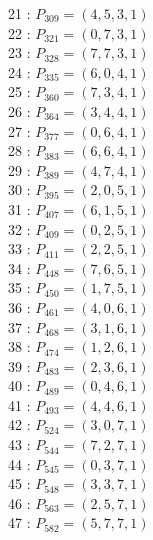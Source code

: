 \documentclass{article}
\begin{document}
{\begin{multicols}{2}
21 : $P_{309}=( 4, 5, 3, 1 )$\\
22 : $P_{321}=( 0, 7, 3, 1 )$\\
23 : $P_{328}=( 7, 7, 3, 1 )$\\
24 : $P_{335}=( 6, 0, 4, 1 )$\\
25 : $P_{360}=( 7, 3, 4, 1 )$\\
26 : $P_{364}=( 3, 4, 4, 1 )$\\
27 : $P_{377}=( 0, 6, 4, 1 )$\\
28 : $P_{383}=( 6, 6, 4, 1 )$\\
29 : $P_{389}=( 4, 7, 4, 1 )$\\
30 : $P_{395}=( 2, 0, 5, 1 )$\\
31 : $P_{407}=( 6, 1, 5, 1 )$\\
32 : $P_{409}=( 0, 2, 5, 1 )$\\
33 : $P_{411}=( 2, 2, 5, 1 )$\\
34 : $P_{448}=( 7, 6, 5, 1 )$\\
35 : $P_{450}=( 1, 7, 5, 1 )$\\
36 : $P_{461}=( 4, 0, 6, 1 )$\\
37 : $P_{468}=( 3, 1, 6, 1 )$\\
38 : $P_{474}=( 1, 2, 6, 1 )$\\
39 : $P_{483}=( 2, 3, 6, 1 )$\\
40 : $P_{489}=( 0, 4, 6, 1 )$\\
41 : $P_{493}=( 4, 4, 6, 1 )$\\
42 : $P_{524}=( 3, 0, 7, 1 )$\\
43 : $P_{544}=( 7, 2, 7, 1 )$\\
44 : $P_{545}=( 0, 3, 7, 1 )$\\
45 : $P_{548}=( 3, 3, 7, 1 )$\\
46 : $P_{563}=( 2, 5, 7, 1 )$\\
47 : $P_{582}=( 5, 7, 7, 1 )$\\
\end{multicols}
}
\end{document}
